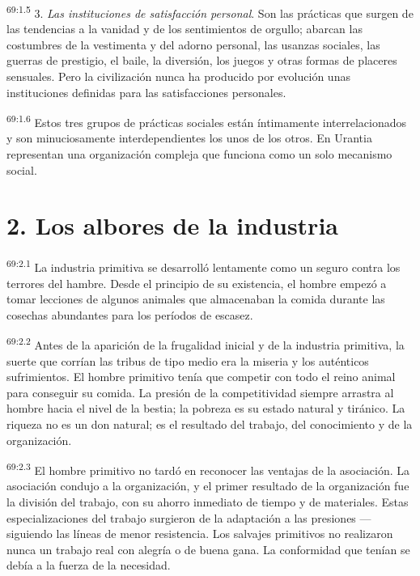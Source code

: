 \documentclass[twoside, 11pt]{book}
\begin{document}
\par
\textsuperscript{69:1.5} 3. \textit{Las instituciones de satisfacción personal}. Son las prácticas que surgen de las tendencias a la vanidad y de los sentimientos de orgullo; abarcan las costumbres de la vestimenta y del adorno personal, las usanzas sociales, las guerras de prestigio, el baile, la diversión, los juegos y otras formas de placeres sensuales. Pero la civilización nunca ha producido por evolución unas instituciones definidas para las satisfacciones personales.

\par
\textsuperscript{69:1.6} Estos tres grupos de prácticas sociales están íntimamente interrelacionados y son minuciosamente interdependientes los unos de los otros. En Urantia representan una organización compleja que funciona como un solo mecanismo social.

\section*{2. Los albores de la industria}
\par
\textsuperscript{69:2.1} La industria primitiva se desarrolló lentamente como un seguro contra los terrores del hambre. Desde el principio de su existencia, el hombre empezó a tomar lecciones de algunos animales que almacenaban la comida durante las cosechas abundantes para los períodos de escasez.

\par
\textsuperscript{69:2.2} Antes de la aparición de la frugalidad inicial y de la industria primitiva, la suerte que corrían las tribus de tipo medio era la miseria y los auténticos sufrimientos. El hombre primitivo tenía que competir con todo el reino animal para conseguir su comida. La presión de la competitividad siempre arrastra al hombre hacia el nivel de la bestia; la pobreza es su estado natural y tiránico. La riqueza no es un don natural; es el resultado del trabajo, del conocimiento y de la organización.

\par
\textsuperscript{69:2.3} El hombre primitivo no tardó en reconocer las ventajas de la asociación. La asociación condujo a la organización, y el primer resultado de la organización fue la división del trabajo, con su ahorro inmediato de tiempo y de materiales. Estas especializaciones del trabajo surgieron de la adaptación a las presiones ---siguiendo las líneas de menor resistencia. Los salvajes primitivos no realizaron nunca un trabajo real con alegría o de buena gana. La conformidad que tenían se debía a la fuerza de la necesidad.
\end{document}
